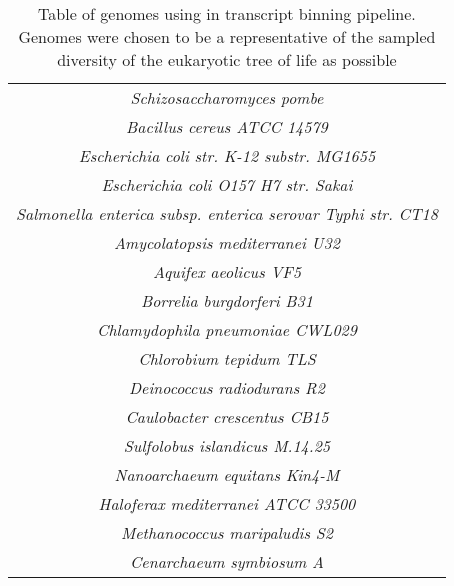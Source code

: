 \begin{table}
\begin{tabular}{|c|}
		\textit{Schizosaccharomyces pombe}\\
		\textit{Bacillus cereus ATCC 14579}\\
		\textit{Escherichia coli str. K-12 substr. MG1655}\\
		\textit{Escherichia coli O157 H7 str. Sakai}\\
		\textit{Salmonella enterica subsp. enterica serovar Typhi str. CT18}\\
		\textit{Amycolatopsis mediterranei U32}\\
		\textit{Aquifex aeolicus VF5}\\
		\textit{Borrelia burgdorferi B31}\\
		\textit{Chlamydophila pneumoniae CWL029}\\
		\textit{Chlorobium tepidum TLS}\\
		\textit{Deinococcus radiodurans R2}\\
		\textit{Caulobacter crescentus CB15}\\
		\textit{Sulfolobus islandicus M.14.25}\\
		\textit{Nanoarchaeum equitans Kin4-M}\\
		\textit{Haloferax mediterranei ATCC 33500}\\
		\textit{Methanococcus maripaludis S2}\\
		\textit{Cenarchaeum symbiosum A}\\
	\hline
	\end{tabular}
	\caption{Table of genomes using in transcript binning pipeline.
		Genomes were chosen to be a representative of the sampled diversity of the 
		eukaryotic tree of life as possible}
	\label{tab:appen_genomes}
\end{table}

